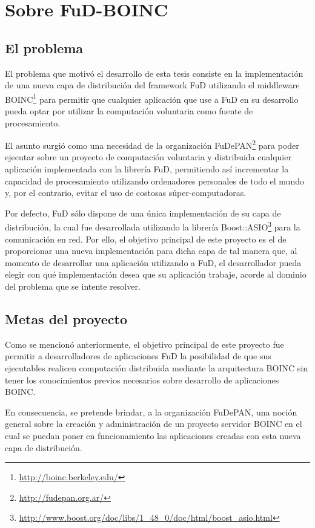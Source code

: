 \chapter{Sobre FuD-BOINC}
\label{chapter:sobre:fud:boinc}


\section{El problema}

El problema que motivó el desarrollo de esta tesis consiste en la implementación de una nueva capa de distribución del framework FuD utilizando el middleware BOINC\footnote{\url{http://boinc.berkeley.edu/}} para permitir que cualquier aplicación que use a FuD en su desarrollo pueda optar por utilizar la computación voluntaria como fuente de procesamiento.

El asunto surgió como una necesidad de la organización FuDePAN\footnote{\url{http://fudepan.org.ar/}} para poder ejecutar sobre un proyecto de computación voluntaria y distribuida cualquier aplicación implementada con la librería FuD, permitiendo así incrementar la capacidad de procesamiento utilizando ordenadores personales de todo el mundo y, por el contrario, evitar el uso de costosas súper-computadoras.

Por defecto, FuD sólo dispone de una única implementación de su capa de distribución, la cual fue desarrollada utilizando la librería Boost::ASIO\footnote{\url{http://www.boost.org/doc/libs/1_48_0/doc/html/boost_asio.html}} para la comunicación en red. Por ello, el objetivo principal de este proyecto es el de proporcionar una nueva implementación para dicha capa de tal manera que, al momento de desarrollar una aplicación utilizando a FuD, el desarrollador pueda elegir con qué implementación desea que su aplicación trabaje, acorde al dominio del problema que se intente resolver.

\section{Metas del proyecto}

Como se mencionó anteriormente, el objetivo principal de este proyecto fue permitir a desarrolladores de aplicaciones FuD la posibilidad de que sus ejecutables realicen computación distribuida mediante la arquitectura BOINC sin tener los conocimientos previos necesarios sobre desarrollo de aplicaciones BOINC. 

En consecuencia, se pretende brindar, a la organización FuDePAN, una noción general sobre la creación y administración de un proyecto servidor BOINC en el cual se puedan poner en funcionamiento las aplicaciones creadas con esta nueva capa de distribución.

